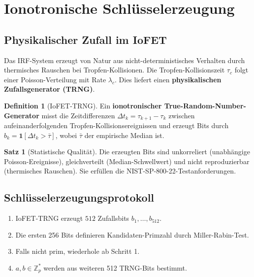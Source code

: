 ﻿\documentclass[a4paper,12pt]{scrreprt}
\theoremstyle{definition}
\newtheorem{definition}{Definition}[section]
\newtheorem{satz}{Satz}[section]
\begin{document}
\section{Ionotronische Schlüsselerzeugung}

\subsection{Physikalischer Zufall im IoFET}

Das IRF-System erzeugt von Natur aus nicht-deterministisches Verhalten
durch thermisches Rauschen bei Tropfen-Kollisionen. Die
Tropfen-Kollisionszeit $\tau_c$ folgt einer Poisson-Verteilung mit
Rate $\lambda_c$. Dies liefert einen \textbf{physikalischen
Zufallsgenerator (TRNG)}.

\begin{definition}[IoFET-TRNG]
  Ein \textbf{ionotronischer True-Random-Number-Gene\-rator} misst die
  Zeitdifferenzen $\Delta t_k = \tau_{k+1} - \tau_k$ zwischen
  aufeinanderfolgenden Tropfen-Kollisions\-ereignissen und erzeugt Bits
  durch $b_k = \mathbf{1}[\Delta t_k > \bar{\tau}]$, wobei
  $\bar\tau$ der empirische Median ist.
\end{definition}

\begin{satz}[Statistische Qualität]
  Die erzeugten Bits sind unkorreliert (unabhängige Poisson-Ereignisse),
  gleichverteilt (Median-Schwellwert) und nicht reproduzierbar
  (thermisches Rauschen). Sie erfüllen die NIST-SP-800-22-Testanforderungen.
\end{satz}

\subsection{Schlüsselerzeugungsprotokoll}

\begin{enumerate}
  \item IoFET-TRNG erzeugt $512$ Zufallsbits $b_1,\ldots,b_{512}$.
  \item Die ersten 256 Bits definieren Kandidaten-Primzahl durch
    Miller-Rabin-Test.
  \item Falls nicht prim, wiederhole ab Schritt 1.
  \item $a, b \in \mathbb{Z}_p^*$ werden aus weiteren 512 TRNG-Bits
    bestimmt.
\end{enumerate}
\end{document}
